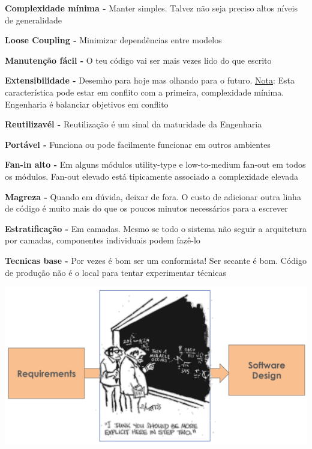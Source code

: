 \documentclass{article}
\begin{document}
\begin{flushleft}
    \textbf{Complexidade mínima -} Manter simples. Talvez não seja preciso altos níveis de generalidade

    \textbf{Loose Coupling -} Minimizar dependências entre modelos

    \textbf{Manutenção fácil -} O teu código vai ser mais vezes lido do que escrito

    \textbf{Extensibilidade -} Desemho para hoje mas olhando para o futuro.
    \uline{Nota}: Esta característica pode estar em conflito com a primeira, complexidade mínima.
    Engenharia é balanciar objetivos em conflito

    \textbf{Reutilizavél -} Reutilização é um sinal da maturidade da Engenharia

    \textbf{Portável -} Funciona ou pode facilmente funcionar em outros ambientes

    \textbf{Fan-in alto -} Em alguns módulos utility-type e low-to-medium fan-out em todos os módulos.
    Fan-out elevado está tipicamente associado a complexidade elevada

    \textbf{Magreza -} Quando em dúvida, deixar de fora. O custo de adicionar outra linha de
    código é muito mais do que os poucos minutos necessários para a escrever

    \textbf{Estratificação -} Em camadas. Mesmo se todo o sistema não seguir a arquitetura
    por camadas, componentes individuais podem fazê-lo

    \textbf{Tecnicas base -} Por vezes é bom ser um conformista! Ser secante é bom.
    Código de produção não é o local para tentar experimentar técnicas
\end{flushleft}

\vspace{3mm}

\begin{center}
    \includegraphics[scale=0.3]{Images/4.png}
\end{center}
\end{document}
